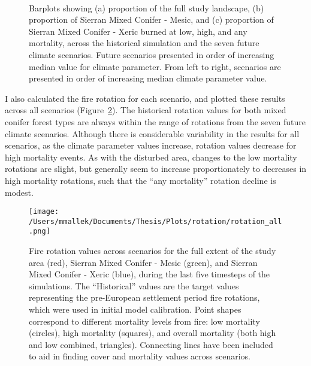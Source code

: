 \begin{figure}[!htbp]
  \centering
     \\
    \caption{Barplots showing (a) proportion of the full study landscape, (b) proportion of Sierran Mixed Conifer - Mesic, and (c) proportion of Sierran Mixed Conifer - Xeric burned at low, high, and any mortality, across the historical simulation and the seven future climate scenarios. Future scenarios presented in order of increasing median value for climate parameter. From left to right, scenarios are presented in order of increasing median climate parameter value.}
  \label{fig:dareacomp}
\end{figure}

I also calculated the fire rotation for each scenario, and plotted these results across all scenarios (Figure~\ref{fig:frotation}). The historical rotation values for both mixed conifer forest types are always within the range of rotations from the seven future climate scenarios. Although there is considerable variability in the results for all scenarios, as the climate parameter values increase, rotation values decrease for high mortality events. As with the disturbed area, changes to the low mortality rotations are slight, but generally seem to increase proportionately to decreases in high mortality rotations, such that the ``any mortality'' rotation decline is modest.



\begin{figure}
\centering
\texttt{[image: /Users/mmallek/Documents/Thesis/Plots/rotation/rotation\_all.png]}
\caption{Fire rotation values across scenarios for the full extent of the study area (red), Sierran Mixed Conifer - Mesic (green), and Sierran Mixed Conifer - Xeric (blue), during the last five timesteps of the simulations. The ``Historical'' values are the target values representing the pre-European settlement period fire rotations, which were used in initial model calibration. Point shapes correspond to different mortality levels from fire: low mortality (circles), high mortality (squares), and overall mortality (both high and low combined, triangles). Connecting lines have been included to aid in finding cover and mortality values across scenarios.}
\label{fig:frotation}
\end{figure}



